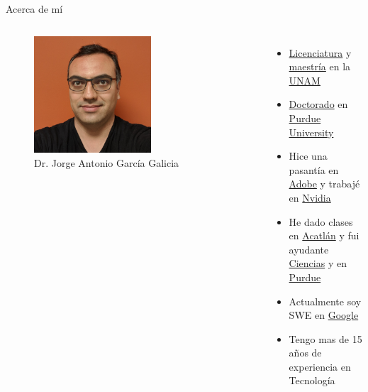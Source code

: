 \begin{frame}{Acerca de mí}
    \begin{columns}
        \begin{figure}[htb]
            \centering
            \includegraphics[width=0.6\textwidth]{img/Avatar12}
            \caption{Dr. Jorge Antonio García Galicia}
        \end{figure}
     \begin{itemize}
         \item \href{https://mac.acatlan.unam.mx/}{Licenciatura} y \href{https://www.pcic.unam.mx/}{maestría} en la \href{https://www.unam.mx/}{UNAM}
         \item \href{https://polytechnic.purdue.edu/degrees/phd-technology}{Doctorado} en \href{https://www.purdue.edu/}{Purdue University}
         \item Hice una pasantía en \href{https://research.adobe.com/}{Adobe} y trabajé en \href{https://www.nvidia.com/}{Nvidia}
         \item He dado clases en \href{https://www.acatlan.unam.mx/}{Acatlán} y fui ayudante \href{https://www.fciencias.unam.mx/directorio/63922}{Ciencias} y en \href{https://polytechnic.purdue.edu/}{Purdue}
         \item Actualmente soy SWE en \href{https://about.google/}{Google}
         \item Tengo mas de 15 años de experiencia en Tecnología
     \end{itemize}
\end{columns}
\end{frame}

